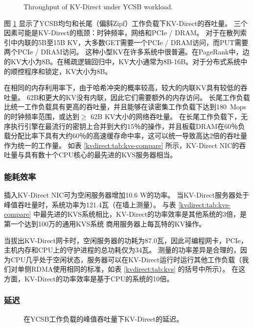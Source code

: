 \begin{figure}[t]
\centering
{}
\caption{Throughput of KV-Direct under YCSB workload.}
\label{kvdirect:fig:ycsb-tput}

\end{figure}

图 \ref {kvdirect:fig:ycsb-tput} 显示了YCSB均匀和长尾（偏斜Zipf）工作负载下KV-Direct的吞吐量。
三个因素可能是KV-Direct的瓶颈：时钟频率，网络和PCIe / DRAM。
对于在散列索引中内联的5B至15B KV，大多数GET需要一个PCIe / DRAM访问，而PUT需要两个PCIe / DRAM访问。
这种小型KV在许多系统中很普遍。在PageRank中，边的KV大小为8B。在稀疏逻辑回归中，KV大小通常为8B-16B。对于分布式系统中的顺控程序和锁定，KV大小为8B。

在相同的内存利用率下，由于哈希冲突的概率较高，较大的内联KV具有较低的吞吐量。
62B和更大的KV没有内联，因此它们需要额外的内存访问。
长尾工作负载比统一工作负载具有更高的吞吐量，并且能够在读密集工作负载下达到180~Mops的时钟频率范围，或达到$ \geq $ 62B KV大小的网络吞吐量。
在长尾工作负载下，无序执行引擎在最流行的密钥上合并到大约15％的操作，并且板载DRAM在60％负载分配比率下具有大约60％的高速缓存命中率，这可以统一导致高达2倍的吞吐量作为统一的工作量。
如表 \ref {kvdirect:tab:kvs-compare} 所示，KV-Direct NIC的吞吐量与具有数十个CPU核心的最先进的KVS服务器相当。

\subsubsection{能耗效率}

插入KV-Direct NIC可为空闲服务器增加10.6 W的功率。
当KV-Direct服务器处于峰值吞吐量时，系统功率为121.4瓦（在墙上测量）。
与表 \ref {kvdirect:tab:kvs-compare} 中最先进的KVS系统相比，KV-Direct的功率效率是其他系统的3倍，是第一个达到100万的通用KVS系统 商用服务器上每瓦特的KV操作。

当拔出KV-Direct网卡时，空闲服务器的功耗为87.0瓦，因此可编程网卡，PCIe，主机内存和CPU上的守护进程的总功耗仅为34瓦。
测量的功率差异是合理的，因为CPU几乎处于空闲状态，服务器可以在KV-Direct运行时运行其他工作负载（我们对单侧RDMA使用相同的标准，如表 \ref {kvdirect:tab:kvs} 的括号中所示）。
在这方面，KV-Direct的功率效率是基于CPU的系统的10倍。

\subsubsection{延迟}
\begin{figure}[t]
\centering
{}
\caption{在YCSB工作负载的峰值吞吐量下KV-Direct的延迟。}
\label{kvdirect:fig:ycsb-lat}

\end{figure}


